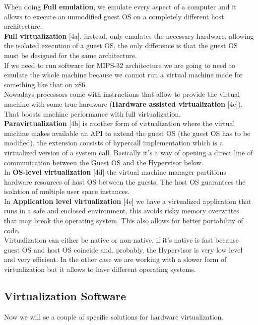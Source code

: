 When doing \textbf{Full emulation}, we emulate every aspect of a computer and it allows to execute an unmodified guest OS on a completely different host architecture. \\
\miniSpace
\textbf{Full virtualization} [4a], instead, only emulates the necessary hardware, allowing the isolated execution of a guest OS, the only difference is that the guest OS must be designed for the same architecture. \\
\miniSpace
If we need to run software for MIPS-32 architecture we are going to need to emulate the whole machine because we cannot run a virtual machine made for something like that on x86. \\
\miniSpace
Nowadays processors come with instructions that allow to provide the virtual machine with some true hardware (\textbf{Hardware assisted virtualization} [4c]). That boosts machine performance with full virtualization. \\
\miniSpace
\textbf{Paravirtualization} [4b] is another form of virtualization where the virtual machine makes available an API to extend the guest OS (the guest OS has to be modified), the extension consists of hypercall implementation which is a virtualized version of a system call. Basically it's a way of opening a direct line of communication between the Guest OS and the Hypervisor below. \\
\miniSpace
In \textbf{OS-level virtualization} [4d] the virtual machine manager partitions hardware resources of host OS between the guests. The host OS guarantees the isolation of multiple user space instances. \\
\miniSpace
In \textbf{Application level virtualization} [4e] we have a virtualized application that runs in a safe and enclosed environment, this avoids risky memory overwrites that may break the operating system. This also allows for better portability of code. \\
\smallSpace
Virtualization can either be native or non-native, if it's native is fast because guest OS and host OS coincide and, probably, the Hypervisor is very low level and very efficient. In the other case we are working with a slower form of virtualization but it allows to have different operating systems. \\

\subsection{Virtualization Software}
Now we will se a couple of specific solutions for hardware virtualization.
